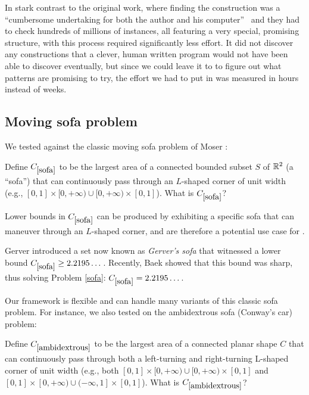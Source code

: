 In stark contrast to the original work, where finding the construction was a  ``cumbersome undertaking for both the author and his computer''~\cite{skutella2016note} and they had to check hundreds of millions of instances, all featuring a very special, promising structure,
with \AlphaEvolve this process required significantly less effort. It did not discover any constructions that a clever, human written program would not have been able to discover eventually, but since we could leave it to \AlphaEvolve to figure out what patterns are promising to try, the effort we had to put in was measured in hours instead of weeks.


\subsection{Moving sofa problem}

We tested \AlphaEvolve against the classic moving sofa problem of Moser \cite{moser}:

\renewcommand{\problemURL}{https://google-deepmind.github.io/alphaevolve_repository_of_problems/problems/62.html}

\begin{problem}\label{sofa}  Define $C_{\ref{sofa}}$ to be the largest area of a connected bounded subset $S$ of $\mathbb{R}^2$ (a ``sofa'') that can continuously pass through an $L$-shaped corner of unit width (e.g., $[0,1] \times [0,+\infty) \cup [0,+\infty) \times [0,1]$).  What is $C_{\ref{sofa}}$?
\end{problem}

Lower bounds in $C_{\ref{sofa}}$ can be produced by exhibiting a specific sofa that can maneuver through an $L$-shaped corner, and are therefore a potential use case for \AlphaEvolve.

Gerver \cite{gerver} introduced a set now known as  \emph{Gerver's sofa} that witnessed a lower bound $C_{\ref{sofa}} \geq 2.2195\dots$.  Recently, Baek \cite{baek} showed that this bound was sharp, thus solving Problem \ref{sofa}: $C_{\ref{sofa}} = 2.2195\dots$.

Our framework is flexible and can handle many variants of this classic sofa problem.  For instance, we also tested \AlphaEvolve on the ambidextrous sofa (Conway's car) problem:

\renewcommand{\problemURL}{https://google-deepmind.github.io/alphaevolve_repository_of_problems/problems/63.html}

\begin{problem}\label{ambidextrous} Define $C_{\ref{ambidextrous}}$ to be the largest area of a connected planar shape $C$ that can continuously pass through both a left-turning and right-turning L-shaped corner of unit width (e.g., both $[0,1] \times [0,+\infty) \cup [0,+\infty) \times [0,1]$ and $[0,1] \times [0,+\infty) \cup (-\infty,1] \times [0,1]$).  What is $C_{\ref{ambidextrous}}$?
\end{problem}

